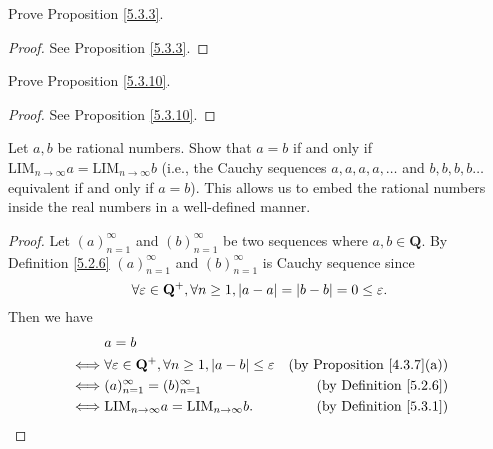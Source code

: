 \exercisesection

\begin{exercise}\label{ex 5.3.1}
    Prove Proposition \ref{5.3.3}.
\end{exercise}

\begin{proof}
    See Proposition \ref{5.3.3}.
\end{proof}

\begin{exercise}\label{ex 5.3.2}
    Prove Proposition \ref{5.3.10}.
\end{exercise}

\begin{proof}
    See Proposition \ref{5.3.10}.
\end{proof}

\begin{exercise}\label{ex 5.3.3}
    Let \(a, b\) be rational numbers.
    Show that \(a = b\) if and only if \(\text{LIM}_{n \to \infty} a = \text{LIM}_{n \to \infty} b\) (i.e., the Cauchy sequences \(a, a, a, a, \dots\) and \(b, b, b, b \dots\) equivalent if and only if \(a = b\)).
    This allows us to embed the rational numbers inside the real numbers in a well-defined manner.
\end{exercise}

\begin{proof}
    Let \((a)_{n = 1}^{\infty}\) and \((b)_{n = 1}^{\infty}\) be two sequences where \(a, b \in \mathbf{Q}\).
    By Definition \ref{5.2.6} \((a)_{n = 1}^\infty\) and \((b)_{n = 1}^\infty\) is Cauchy sequence since
    \[
        \forall \varepsilon \in \mathbf{Q}^+, \forall n \geq 1, \abs*{a - a} = \abs*{b - b} = 0 \leq \varepsilon.
    \]
    Then we have
    \begin{align*}
             & a = b                                                                                                                          \\
        \iff & \forall \varepsilon \in \mathbf{Q}^+, \forall n \geq 1, \abs*{a - b} \leq \varepsilon & \text{(by Proposition \ref{4.3.7}(a))} \\
        \iff & (a)_{n = 1}^\infty = (b)_{n = 1}^\infty                                               & \text{(by Definition \ref{5.2.6})}     \\
        \iff & \text{LIM}_{n \to \infty} a = \text{LIM}_{n \to \infty} b.                            & \text{(by Definition \ref{5.3.1})}
    \end{align*}
\end{proof}

